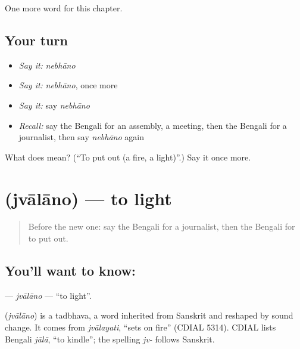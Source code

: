 \begin{grammarlens}[title={What you've built}]
One more word for this chapter.
\end{grammarlens}

\subsection*{Your turn}
\begin{itemize}
\raggedright
  \item \emph{Say it:} \emph{nebhāno}
  \item \emph{Say it:} \emph{nebhāno}, once more
  \item \emph{Say it:} say \emph{nebhāno}
  \item \emph{Recall:} say the Bengali for an assembly, a meeting, then the Bengali for a journalist, then say \emph{nebhāno} again
\end{itemize}

\begin{tcolorbox}[breakable,colback=teal!4,colframe=teal!35!black,title={Before you move on}]
What does  mean? (\textquotedblleft{}To put out (a fire, a light)\textquotedblright{}.) Say it once more.
\end{tcolorbox}
\section[\texorpdfstring{\bn{জ্বালানো} (jvālāno)}{জ্বালানো (jvālāno)}]{ (jvālāno) — to light}

\label{lesson:BN-C237-jvalano}



\begin{quote}
Before the new one: say the Bengali for a journalist, then the Bengali for to put out.
\end{quote}

\subsection*{You'll want to know: }
\textbf{} — \emph{jvālāno} — \textquotedblleft{}to light\textquotedblright{}.

\begin{cousinweb}
\textbf{} (\emph{jvālāno}) is a tadbhava, a word inherited from Sanskrit and reshaped by sound change. It comes from \emph{jvālayati}, \textquotedblleft{}sets on fire\textquotedblright{} (CDIAL 5314). CDIAL lists Bengali \emph{jālā}, \textquotedblleft{}to kindle\textquotedblright{}; the spelling \emph{jv-} follows Sanskrit.
\end{cousinweb}

